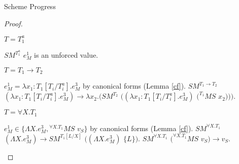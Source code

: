 \begin{theorem}{Scheme Progress}
\begin{proof}
\begin{case}
\begin{subcase}
\end{subcase}

\begin{subcase}

$T=T_{1}^{a}$

$SM^{T_{1}^{a}}$ $e_{M}^{1}$ is an unforced value.

\end{subcase}

\begin{subcase}

$T=T_{1}\rightarrow T_{2}$

$e_{M}^{1}=\lambda x_{1}:T_{1}[T_{i}/T_{i}^{a}].e_{M}^{3}$ by canonical forms (Lemma \ref{cf}).  $SM^{T_{1}\rightarrow T_{2}}$ $(\lambda x_{1}:T_{1}[T_{i}/T_{i}^{a}].e_{M}^{3})\rightarrow\lambda x_{2}.(SM^{T_{2}}$ $((\lambda x_{1}:T_{1}[T_{i}/T_{i}^{a}].e_{M}^{3})$ $(^{T_{1}}MS$ $x_{2})))$.

\end{subcase}

\begin{subcase}

$T=\forall X.T_{1}$

$e_{M}^{1}\in\lbrace\Lambda X.e_{M}^{3},{^{\forall X.T_{1}}M}S$ $v_{S}\rbrace$ by canonical forms (Lemma \ref{cf}).  $SM^{\forall X.T_{1}}$ $(\Lambda X.e_{M}^{3})\rightarrow SM^{T_{1}[L/X]}$ $((\Lambda X.e_{M}^{3})$ $\lbrace L\rbrace)$.  $SM^{\forall X.T_{1}}$ $(^{\forall X.T_{1}}MS$ $v_{S})\rightarrow v_{S}$.

\end{subcase}

\end{case}

\end{proof}

\end{theorem}
